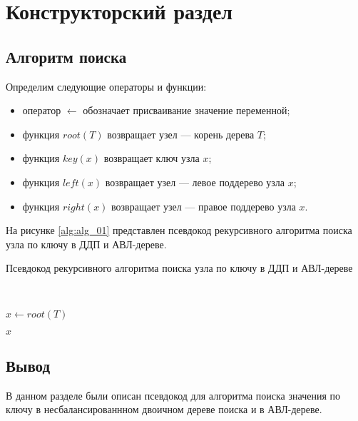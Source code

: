 \chapter{Конструкторский раздел}

\section{Алгоритм поиска}

Определим следующие операторы и функции:

\begin{itemize}[label*=--]
	\item оператор $\gets$ обозначает присваивание значение переменной;
	\item функция $root(T)$ возвращает узел --- корень дерева $T$;
	\item функция $key(x)$ возвращает ключ узла $x$;
	\item функция $left(x)$ возвращает узел --- левое поддерево узла $x$;
	\item функция $right(x)$ возвращает узел --- правое поддерево узла $x$.
\end{itemize}

На рисунке \ref{alg:alg_01} представлен псевдокод рекурсивного алгоритма поиска узла по ключу в ДДП и АВЛ-дереве.

\begin{algorithm}[H]
	\caption{Псевдокод рекурсивного алгоритма поиска узла по ключу в ДДП и АВЛ-дереве}
	\label{alg:alg_01}
	\\
	\begin{algorithmic}[1]
		\State $x \gets root(T)$
		
		\State \Return $x$
		\EndIf
		
		\State \Return {}
		\Else
		\State \Return {}
		\EndIf
		
		\EndFunction
	\end{algorithmic}
\end{algorithm}

%
%		
%		
%		


\section*{Вывод}

В данном разделе были описан псевдокод для алгоритма поиска значения по ключу в несбалансированнном двоичном дереве поиска и в АВЛ-дереве.



